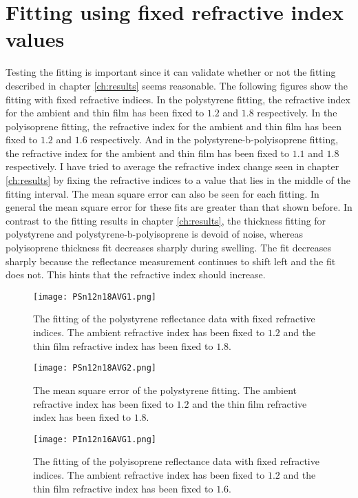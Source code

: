 \documentclass[MasterThesisMain.tex]{subfiles}
\begin{document}
\section{Fitting using fixed refractive index values}
Testing the fitting is important since it can validate whether or not the fitting described in chapter \ref{ch:results} seems reasonable. The following figures show the fitting with fixed refractive indices. In the polystyrene fitting, the refractive index for the ambient and thin film has been fixed to $1.2$ and $1.8$ respectively. In the polyisoprene fitting, the refractive index for the ambient and thin film has been fixed to $1.2$ and $1.6$ respectively. And in the polystyrene-b-polyisoprene fitting, the refractive index for the ambient and thin film has been fixed to $1.1$ and $1.8$ respectively. I have tried to average the refractive index change seen in chapter \ref{ch:results} by fixing the refractive indices to a value that lies in the middle of the fitting interval. The mean square error can also be seen for each fitting. In general the mean square error for these fits are greater than that shown before. In contrast to the fitting results in chapter \ref{ch:results}, the thickness fitting for polystyrene and polystyrene-b-polyisoprene is devoid of noise, whereas polyisoprene thickness fit decreases sharply during swelling. The fit decreases sharply because the reflectance measurement continues to shift left and the fit does not. This hints that the refractive index should increase.
\begin{figure}[H]
\centering
\texttt{[image: PSn12n18AVG1.png]}
\caption{The fitting of the polystyrene reflectance data with fixed refractive indices. The ambient refractive index has been fixed to $1.2$ and the thin film refractive index has been fixed to $1.8$.}
\label{}
\end{figure}

\begin{figure}[H]
\centering
\texttt{[image: PSn12n18AVG2.png]}
\caption{The mean square error of the polystyrene fitting. The ambient refractive index has been fixed to $1.2$ and the thin film refractive index has been fixed to $1.8$.}
\label{}
\end{figure}

\begin{figure}[H]
\centering
\texttt{[image: PIn12n16AVG1.png]}
\caption{The fitting of the polyisoprene reflectance data with fixed refractive indices. The ambient refractive index has been fixed to $1.2$ and the thin film refractive index has been fixed to $1.6$.}
\label{}
\end{figure}
\end{document}

